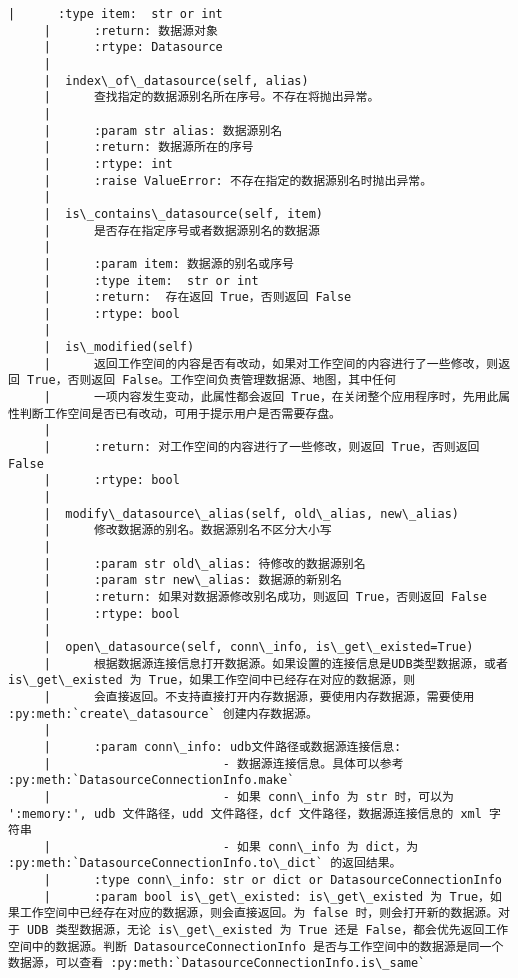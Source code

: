 \documentclass[11pt]{article}
\begin{document}
\begin{Verbatim}[commandchars=\\\{\}]
     |      :type item:  str or int
     |      :return: 数据源对象
     |      :rtype: Datasource
     |  
     |  index\_of\_datasource(self, alias)
     |      查找指定的数据源别名所在序号。不存在将抛出异常。
     |      
     |      :param str alias: 数据源别名
     |      :return: 数据源所在的序号
     |      :rtype: int
     |      :raise ValueError: 不存在指定的数据源别名时抛出异常。
     |  
     |  is\_contains\_datasource(self, item)
     |      是否存在指定序号或者数据源别名的数据源
     |      
     |      :param item: 数据源的别名或序号
     |      :type item:  str or int
     |      :return:  存在返回 True，否则返回 False
     |      :rtype: bool
     |  
     |  is\_modified(self)
     |      返回工作空间的内容是否有改动，如果对工作空间的内容进行了一些修改，则返回 True，否则返回 False。工作空间负责管理数据源、地图，其中任何
     |      一项内容发生变动，此属性都会返回 True，在关闭整个应用程序时，先用此属性判断工作空间是否已有改动，可用于提示用户是否需要存盘。
     |      
     |      :return: 对工作空间的内容进行了一些修改，则返回 True，否则返回 False
     |      :rtype: bool
     |  
     |  modify\_datasource\_alias(self, old\_alias, new\_alias)
     |      修改数据源的别名。数据源别名不区分大小写
     |      
     |      :param str old\_alias: 待修改的数据源别名
     |      :param str new\_alias: 数据源的新别名
     |      :return: 如果对数据源修改别名成功，则返回 True，否则返回 False
     |      :rtype: bool
     |  
     |  open\_datasource(self, conn\_info, is\_get\_existed=True)
     |      根据数据源连接信息打开数据源。如果设置的连接信息是UDB类型数据源，或者 is\_get\_existed 为 True，如果工作空间中已经存在对应的数据源，则
     |      会直接返回。不支持直接打开内存数据源，要使用内存数据源，需要使用 :py:meth:`create\_datasource` 创建内存数据源。
     |      
     |      :param conn\_info: udb文件路径或数据源连接信息:
     |                        - 数据源连接信息。具体可以参考 :py:meth:`DatasourceConnectionInfo.make`
     |                        - 如果 conn\_info 为 str 时，可以为 ':memory:', udb 文件路径，udd 文件路径，dcf 文件路径，数据源连接信息的 xml 字符串
     |                        - 如果 conn\_info 为 dict，为  :py:meth:`DatasourceConnectionInfo.to\_dict` 的返回结果。
     |      :type conn\_info: str or dict or DatasourceConnectionInfo
     |      :param bool is\_get\_existed: is\_get\_existed 为 True，如果工作空间中已经存在对应的数据源，则会直接返回。为 false 时，则会打开新的数据源。对于 UDB 类型数据源，无论 is\_get\_existed 为 True 还是 False，都会优先返回工作空间中的数据源。判断 DatasourceConnectionInfo 是否与工作空间中的数据源是同一个数据源，可以查看 :py:meth:`DatasourceConnectionInfo.is\_same`

\end{Verbatim}
\end{document}
